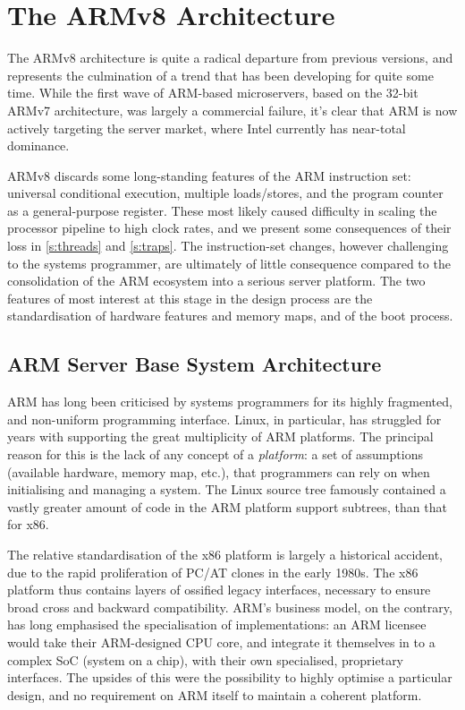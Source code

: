 \documentclass[a4paper,twoside]{report}
\begin{document}
\section{The ARMv8 Architecture}

The ARMv8 architecture is quite a radical departure from previous versions,
and represents the culmination of a trend that has been developing for quite
some time. While the first wave of ARM-based microservers, based on the 32-bit
ARMv7 architecture, was largely a commercial failure, it's clear that ARM is
now actively targeting the server market, where Intel currently has near-total
dominance.

ARMv8 discards some long-standing features of the ARM instruction set:
universal conditional execution, multiple loads/stores, and the program
counter as a general-purpose register. These most likely caused difficulty in
scaling the processor pipeline to high clock rates, and we present some
consequences of their loss in \autoref{s:threads} and \autoref{s:traps}. The
instruction-set changes, however challenging to the systems programmer, are
ultimately of little consequence compared to the consolidation of the ARM
ecosystem into a serious server platform. The two features of most interest at
this stage in the design process are the standardisation of hardware features
and memory maps, and of the boot process.

\subsection{ARM Server Base System Architecture}\label{s:sbsa}

ARM has long been criticised by systems programmers for its highly fragmented,
and non-uniform programming interface. Linux, in particular, has struggled for
years with supporting the great multiplicity of ARM platforms.  The principal
reason for this is the lack of any concept of a \emph{platform}: a set of
assumptions (available hardware, memory map, etc.), that programmers can rely
on when initialising and managing a system. The Linux source tree famously
contained a vastly greater amount of code in the ARM platform support
subtrees, than that for x86.

The relative standardisation of the x86 platform is largely a historical
accident, due to the rapid proliferation of PC/AT clones in the early 1980s.
The x86 platform thus contains layers of ossified legacy interfaces, necessary
to ensure broad cross and backward compatibility.  ARM's business model, on
the contrary, has long emphasised the specialisation of implementations: an
ARM licensee would take their ARM-designed CPU core, and integrate it
themselves in to a complex SoC (system on a chip), with their own specialised,
proprietary interfaces. The upsides of this were the possibility to highly
optimise a particular design, and no requirement on ARM itself to maintain a
coherent platform.
\end{document}
